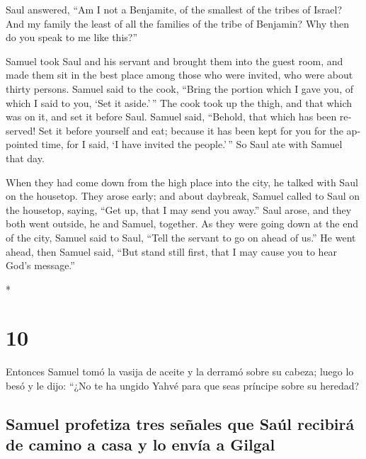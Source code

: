 \begin{paracol}{2}
\begin{otherlanguage}{english}
 Saul answered, ``Am I not a Benjamite, of the smallest
of the tribes of Israel? And my family the least of all the families of
the tribe of Benjamin? Why then do you speak to me like this?''

 Samuel took Saul and his servant and brought them into
the guest room, and made them sit in the best place among those who were
invited, who were about thirty persons.  Samuel said to
the cook, ``Bring the portion which I gave you, of which I said to you,
`Set it aside.'\,''  The cook took up the thigh, and that
which was on it, and set it before Saul. Samuel said, ``Behold, that
which has been reserved! Set it before yourself and eat; because it has
been kept for you for the appointed time, for I said, `I have invited
the people.'\,'' So Saul ate with Samuel that day.

 When they had come down from the high place into the
city, he talked with Saul on the housetop.  They arose
early; and about daybreak, Samuel called to Saul on the housetop,
saying, ``Get up, that I may send you away.'' Saul arose, and they both
went outside, he and Samuel, together.  As they were
going down at the end of the city, Samuel said to Saul, ``Tell the
servant to go on ahead of us.'' He went ahead, then Samuel said, ``But
stand still first, that I may cause you to hear God's message.''

\end{otherlanguage}

\switchcolumn[0]*

\hypertarget{section-18}{%
\section{10}\label{section-18}}

 Entonces Samuel tomó la vasija de aceite y la derramó
sobre su cabeza; luego lo besó y le dijo: ``¿No te ha ungido Yahvé para
que seas príncipe sobre su heredad?

\hypertarget{samuel-profetiza-tres-seuxf1ales-que-sauxfal-recibiruxe1-de-camino-a-casa-y-lo-envuxeda-a-gilgal}{%
\subsection{Samuel profetiza tres señales que Saúl recibirá de camino a
casa y lo envía a
Gilgal}\label{samuel-profetiza-tres-seuxf1ales-que-sauxfal-recibiruxe1-de-camino-a-casa-y-lo-envuxeda-a-gilgal}}


\end{paracol}
